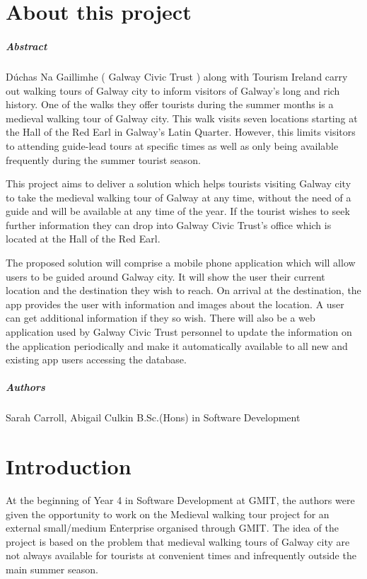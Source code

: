 
\chapter*{About this project}
\paragraph{Abstract}

Dúchas Na Gaillimhe ( Galway Civic Trust ) along with Tourism Ireland carry out walking tours of Galway city to inform visitors of Galway's long and rich history. One of the walks they offer tourists during the summer months is a medieval walking tour of Galway city. This walk visits seven locations starting at the Hall of the Red Earl in Galway’s Latin Quarter. However, this limits visitors to attending guide-lead tours at specific times as well as only being available frequently during the summer tourist season.

This project aims to deliver a solution which helps tourists visiting Galway city to take the medieval walking tour of Galway at any time, without the need of a guide and will be available at any time of the year. If the tourist wishes to seek further information they can drop into Galway Civic Trust's office which is located at the Hall of the Red Earl.

The proposed solution will comprise a mobile phone application which will allow users to be guided around Galway city. It will show the user their current location and the destination they wish to reach. On arrival at the destination, the app provides the user with information and images about the location. A user can get additional information if they so wish. There will also be a web application used by Galway Civic Trust personnel to update the information on the application periodically and make it automatically available to all new and existing app users accessing the database.

\paragraph{Authors}
Sarah Carroll, Abigail Culkin
B.Sc.(Hons) in Software Development

\chapter{Introduction}

At the beginning of Year 4 in Software Development at GMIT, the authors were given the opportunity to work on the Medieval walking tour project for an external small/medium Enterprise organised through GMIT. The idea of the project is based on the problem that medieval walking tours of Galway city are not always available for tourists at convenient times and infrequently outside the main summer season. 

